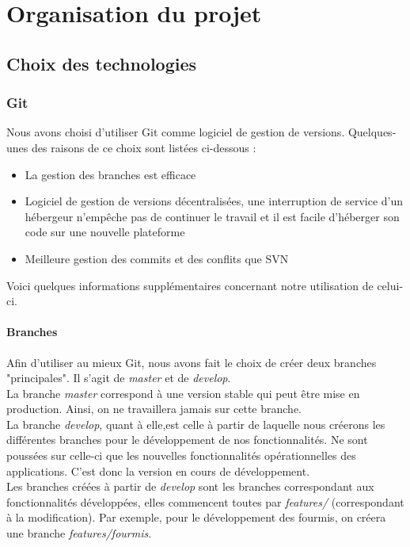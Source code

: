 \chapter{Organisation du projet}

	\section{Choix des technologies}

		\subsection{Git}

			Nous avons choisi d'utiliser Git comme logiciel de gestion de versions. Quelques-unes des raisons de ce choix sont listées ci-dessous :

			\begin{itemize}
				\item{La gestion des branches est efficace}
				\item{Logiciel de gestion de versions décentralisées, une interruption de service d'un hébergeur n'empêche pas de continuer le travail et il est facile d'héberger son code sur une nouvelle plateforme}
				\item{Meilleure gestion des commits et des conflits que SVN}
			\end{itemize}

			Voici quelques informations supplémentaires concernant notre utilisation de celui-ci.

			\subsubsection{Branches}

				Afin d'utiliser au mieux Git, nous avons fait le choix de créer deux branches "principales". Il s'agit de \textit{master} et de \textit{develop}.\\
				La branche \textit{master} correspond à une version stable qui peut être mise en production. Ainsi, on ne travaillera jamais sur cette branche.\\
				La branche \textit{develop}, quant à elle,est celle à partir de laquelle nous créerons les différentes branches pour le développement de nos fonctionnalités. Ne sont poussées sur celle-ci que les nouvelles fonctionnalités opérationnelles des applications. C'est donc la version en cours de développement.\\
				Les branches créées à partir de \textit{develop} sont les branches correspondant aux fonctionnalités développées, elles commencent toutes par \textit{features/} (correspondant à la modification). Par exemple, pour le développement des fourmis, on créera une branche \textit{features/fourmis}.

